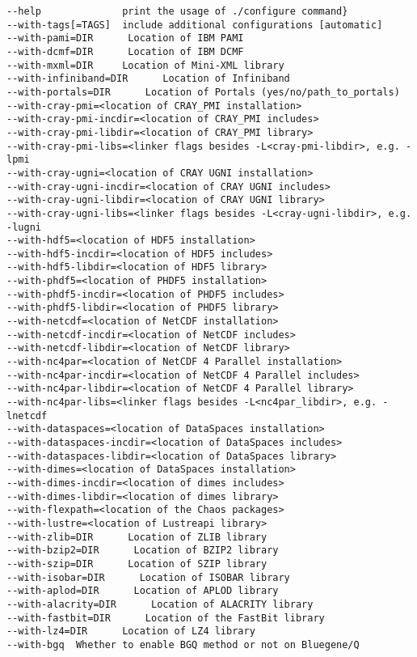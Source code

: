 \begin{lstlisting}
--help              print the usage of ./configure command}
--with-tags[=TAGS]  include additional configurations [automatic]
--with-pami=DIR      Location of IBM PAMI
--with-dcmf=DIR      Location of IBM DCMF
--with-mxml=DIR     Location of Mini-XML library
--with-infiniband=DIR      Location of Infiniband
--with-portals=DIR      Location of Portals (yes/no/path_to_portals)
--with-cray-pmi=<location of CRAY_PMI installation>
--with-cray-pmi-incdir=<location of CRAY_PMI includes>
--with-cray-pmi-libdir=<location of CRAY_PMI library>
--with-cray-pmi-libs=<linker flags besides -L<cray-pmi-libdir>, e.g. -lpmi
--with-cray-ugni=<location of CRAY UGNI installation>
--with-cray-ugni-incdir=<location of CRAY UGNI includes>
--with-cray-ugni-libdir=<location of CRAY UGNI library>
--with-cray-ugni-libs=<linker flags besides -L<cray-ugni-libdir>, e.g. -lugni
--with-hdf5=<location of HDF5 installation>
--with-hdf5-incdir=<location of HDF5 includes>
--with-hdf5-libdir=<location of HDF5 library>
--with-phdf5=<location of PHDF5 installation>
--with-phdf5-incdir=<location of PHDF5 includes>
--with-phdf5-libdir=<location of PHDF5 library>
--with-netcdf=<location of NetCDF installation>
--with-netcdf-incdir=<location of NetCDF includes>
--with-netcdf-libdir=<location of NetCDF library>
--with-nc4par=<location of NetCDF 4 Parallel installation>
--with-nc4par-incdir=<location of NetCDF 4 Parallel includes>
--with-nc4par-libdir=<location of NetCDF 4 Parallel library>
--with-nc4par-libs=<linker flags besides -L<nc4par_libdir>, e.g. -lnetcdf
--with-dataspaces=<location of DataSpaces installation>
--with-dataspaces-incdir=<location of DataSpaces includes>
--with-dataspaces-libdir=<location of DataSpaces library>
--with-dimes=<location of DataSpaces installation>
--with-dimes-incdir=<location of dimes includes>
--with-dimes-libdir=<location of dimes library>
--with-flexpath=<location of the Chaos packages>
--with-lustre=<location of Lustreapi library>
--with-zlib=DIR      Location of ZLIB library
--with-bzip2=DIR      Location of BZIP2 library
--with-szip=DIR      Location of SZIP library
--with-isobar=DIR      Location of ISOBAR library
--with-aplod=DIR      Location of APLOD library
--with-alacrity=DIR      Location of ALACRITY library
--with-fastbit=DIR      Location of the FastBit library
--with-lz4=DIR      Location of LZ4 library
--with-bgq 	Whether to enable BGQ method or not on Bluegene/Q
\end{lstlisting}


